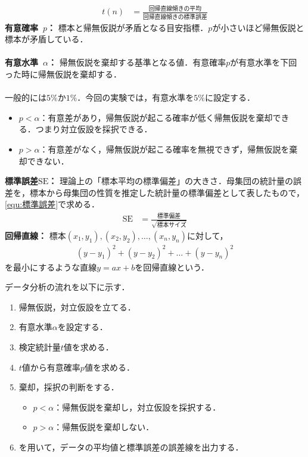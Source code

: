 \begin{oframed}
    \begin{align}
        t(n) & = \frac{\textrm{回帰直線傾きの平均}}{\textrm{回帰直線傾きの標準誤差}}\label{equ:t値}
    \end{align}
    \textbf{有意確率\ \(p\)：} 標本と帰無仮説が矛盾となる目安指標．\(p\)が小さいほど帰無仮説と標本が矛盾している．\\ \\
    \textbf{有意水準\ \(\alpha\)：} 帰無仮説を棄却する基準となる値．有意確率\(p\)が有意水準を下回った時に帰無仮説を棄却する．\\ \\
    一般的には\(5\%\)か\(1\%\)．今回の実験では，有意水準を\(5\%\)に設定する．
    \begin{itemize}
        \item \(p<\alpha\)：有意差があり，帰無仮説が起こる確率が低く帰無仮説を棄却できる．つまり対立仮設を採択できる．
        \item \(p>\alpha\)：有意差がなく，帰無仮説が起こる確率を無視できず，帰無仮説を棄却できない．
    \end{itemize}
    \textbf{標準誤差\(\textrm{SE}\)：} 理論上の「標本平均の標準偏差」の大きさ．母集団の統計量の誤差を，標本から母集団の性質を推定した統計量の標準偏差として表したもので，\eqref{equ:標準誤差}で求める．
    \begin{align}
        \textrm{SE} & =\frac{\textrm{標準偏差}}{\sqrt{標本サイズ}}\label{equ:標準誤差}
    \end{align}
    \textbf{回帰直線：} 標本\((x_1,y_1),(x_2,y_2),\dots ,(x_n,y_n)\)に対して，
    \begin{align*}
        (y-y_1)^2+(y-y_2)^2+\dots +(y-y_n)^2
    \end{align*}
    を最小にするような直線\(y=ax+b\)を回帰直線という．\\
    \hfill\cite[p.168, p.187, p.200\ -\ p.205]{Pythonで学ぶあたらしい統計学の教科書}
\end{oframed}
データ分析の流れを以下に示す．
\begin{multicols}{2}
    \begin{enumerate}
        \item 帰無仮説，対立仮設を立てる．
        \item 有意水準\(\alpha\)を設定する．
        \item 検定統計量\(t\)値を求める．
        \item \(t\)値から有意確率\(p\)値を求める．
        \item 棄却，採択の判断をする．
              \begin{itemize}
                  \item \(p<\alpha\)：帰無仮説を棄却し，対立仮設を採択する．
                  \item \(p>\alpha\)：帰無仮説を棄却しない．
              \end{itemize}
        \item \matlab を用いて，データの平均値と標準誤差の誤差線を出力する．
    \end{enumerate}
\end{multicols}
